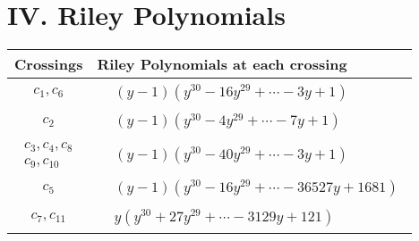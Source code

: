 \documentclass[1p]{elsarticle_modified}
\theoremstyle{definition}
\begin{document}
\centering \section*{ IV. Riley Polynomials}
\begin{tabular}{m{50pt}|m{274pt}}
Crossings & \hspace{64pt}Riley Polynomials at each crossing \\
\hline $$\begin{aligned}c_{1},c_{6}\end{aligned}$$&$\begin{aligned}
&(y-1)(y^{30}-16 y^{29}+\cdots-3 y+1)
\end{aligned}$\\
\hline $$\begin{aligned}c_{2}\end{aligned}$$&$\begin{aligned}
&(y-1)(y^{30}-4 y^{29}+\cdots-7 y+1)
\end{aligned}$\\
\hline $$\begin{aligned}c_{3},c_{4},c_{8}\\c_{9},c_{10}\end{aligned}$$&$\begin{aligned}
&(y-1)(y^{30}-40 y^{29}+\cdots-3 y+1)
\end{aligned}$\\
\hline $$\begin{aligned}c_{5}\end{aligned}$$&$\begin{aligned}
&(y-1)(y^{30}-16 y^{29}+\cdots-36527 y+1681)
\end{aligned}$\\
\hline $$\begin{aligned}c_{7},c_{11}\end{aligned}$$&$\begin{aligned}
&y(y^{30}+27 y^{29}+\cdots-3129 y+121)
\end{aligned}$\\
\hline
\end{tabular}
\vskip 2pc
\end{document}
